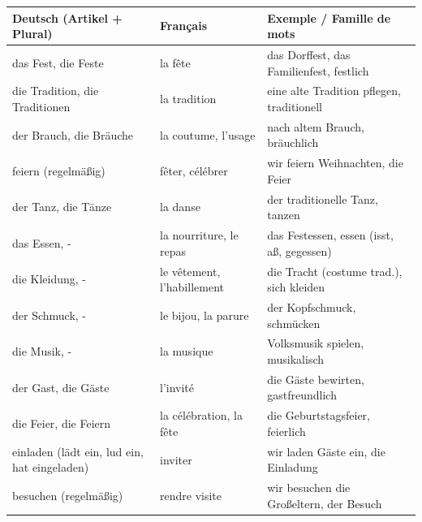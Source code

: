 \documentclass[11pt]{article}
\begin{document}
\begin{definition}
\begin{center}
\begin{tabularx}{\linewidth}{|X|X|X|}
\hline
\rowcolor{popblueL} \textbf{Deutsch (Artikel + Plural)} & \textbf{Français} & \textbf{Exemple / Famille de mots} \\
\hline
das Fest, die Feste & la fête & das Dorffest, das Familienfest, festlich \\
die Tradition, die Traditionen & la tradition & eine alte Tradition pflegen, traditionell \\
der Brauch, die Bräuche & la coutume, l'usage & nach altem Brauch, bräuchlich \\
feiern (regelmäßig) & fêter, célébrer & wir feiern Weihnachten, die Feier \\
der Tanz, die Tänze & la danse & der traditionelle Tanz, tanzen \\
das Essen, - & la nourriture, le repas & das Festessen, essen (isst, aß, gegessen) \\
die Kleidung, - & le vêtement, l'habillement & die Tracht (costume trad.), sich kleiden \\
der Schmuck, - & le bijou, la parure & der Kopfschmuck, schmücken \\
die Musik, - & la musique & Volksmusik spielen, musikalisch \\
der Gast, die Gäste & l'invité & die Gäste bewirten, gastfreundlich \\
die Feier, die Feiern & la célébration, la fête & die Geburtstagsfeier, feierlich \\
einladen (lädt ein, lud ein, hat eingeladen) & inviter & wir laden Gäste ein, die Einladung \\
besuchen (regelmäßig) & rendre visite & wir besuchen die Großeltern, der Besuch \\
\hline
\end{tabularx}
\end{center}
\end{definition}
\end{document}
